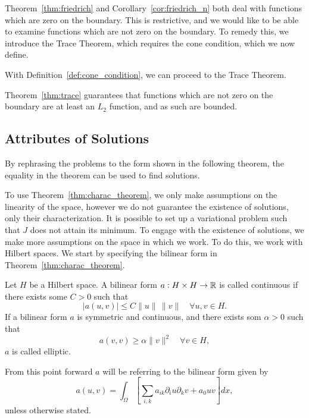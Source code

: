 
Theorem~\ref{thm:friedrich} and Corollary~\ref{cor:friedrich_n} both deal with 
functions which are zero on the boundary. 
This is restrictive, and we would like to be able to examine 
functions which are not zero on the boundary.
To remedy this, we introduce the Trace Theorem, which requires the cone condition, which we now define.

With Definition~\ref{def:cone_condition}, we can proceed to the Trace Theorem.

Theorem~\ref{thm:trace} guarantees that functions which are not 
zero on the boundary are at least an $L_2$ function, and as such are bounded. %
\subsection{Attributes of Solutions}
By rephrasing the problems to the form shown in the 
following theorem,
the equality in the theorem can be used to find solutions. %

To use Theorem~\ref{thm:charac_theorem}, we
only make assumptions on the linearity of the space, however we
do not guarantee the existence  of solutions, only their characterization.
It is possible to set up a variational problem such that $J$ does 
not attain its minimum.
To engage with the existence of solutions, we make more assumptions on 
the space in which we work. To do this, we work with Hilbert spaces. %
We start by specifying the bilinear form in Theorem~\ref{thm:charac_theorem}.
\begin{defn}{\quad}
   Let $H$ be a Hilbert space. A bilinear form $a : H \times H \to \mathbb{R}$ is 
   called continuous if there exists some $C > 0$ such that 
   \begin{equation}
    |a(u,v)| \leq C \|u\|\, \|v\| \quad \forall u,v \in H.
   \end{equation} 
   If a bilinear form $a$ is symmetric and continuous, and there exists som $\alpha >0$ such that 
   \begin{equation*}
    a(v,v) \geq \alpha \|v\|^2 \quad \forall v \in H,
   \end{equation*}
   $a$ is called elliptic.\label{def:elliptic}
 \end{defn}
From this point forward $a$ will be referring to the bilinear form given by
\begin{equation}
   a(u,v) = \int_\Omega \left[\sum_{i,k} a_{ik}\partial_i u\partial_k v+a_0uv\right]dx,
\end{equation}
unless otherwise stated.

